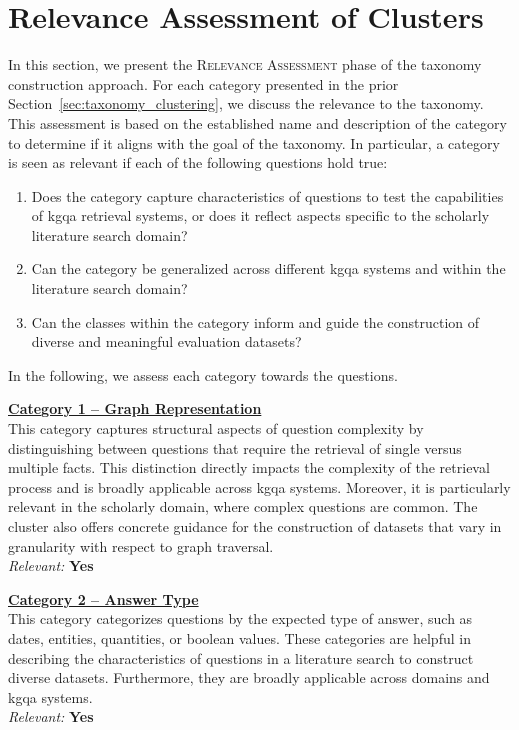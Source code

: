 
\section{Relevance Assessment of Clusters}
\label{sec:relevance_of_clusters_analysis}

In this section, we present the \textsc{Relevance Assessment} phase of the taxonomy construction approach. For each category presented in the prior Section~\ref{sec:taxonomy_clustering}, we discuss the relevance to the taxonomy. This assessment is based on the established name and description of the category to determine if it aligns with the goal of the taxonomy. In particular, a category is seen as relevant if each of the following questions hold true:

\begin{enumerate}[label=\textbf{GQ\arabic*.}, leftmargin=2.5em]
    \item Does the category capture characteristics of questions to test the capabilities of \gls{kgqa} retrieval systems, or does it reflect aspects specific to the scholarly literature search domain?
    \item Can the category be generalized across different \gls{kgqa} systems and within the literature search domain?
    \item Can the classes within the category inform and guide the construction of diverse and meaningful evaluation datasets?
\end{enumerate}

In the following, we assess each category towards the questions.

\hyperref[enum:cluster_1]{\textbf{Category 1 – Graph Representation}} \\
This category captures structural aspects of question complexity by distinguishing between questions that require the retrieval of single versus multiple facts. This distinction directly impacts the complexity of the retrieval process and is broadly applicable across \gls{kgqa} systems. Moreover, it is particularly relevant in the scholarly domain, where complex questions are common. The cluster also offers concrete guidance for the construction of datasets that vary in granularity with respect to graph traversal. \\
\textit{Relevant:} \textbf{Yes}

\hyperref[enum:cluster_2]{\textbf{Category 2 – Answer Type}} \\
This category categorizes questions by the expected type of answer, such as dates, entities, quantities, or boolean values. These categories are helpful in describing the characteristics of questions in a literature search to construct diverse datasets. Furthermore, they are broadly applicable across domains and \gls{kgqa} systems. \\
\textit{Relevant:} \textbf{Yes}

